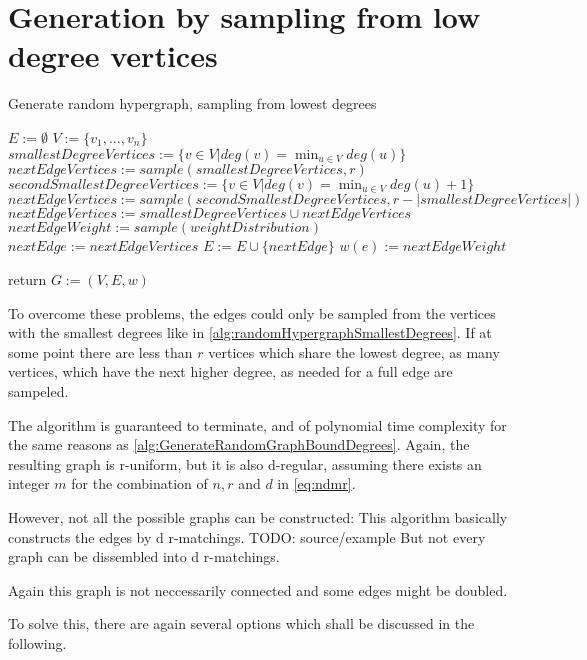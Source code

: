 \section{Generation by sampling from low degree vertices}
\begin{algorithm}
	\caption{Generate random hypergraph, sampling from lowest degrees\label{alg:randomHypergraphSmallestDegrees}} 
	\begin{algorithmic}
		\State $E := \emptyset$
		\State $V := \{v_1, \ldots, v_n\}$
		\State $ smallestDegreeVertices := \{v\in V| deg(v) = \min_{u\in V} deg(u) \}$
		\State $nextEdgeVertices := sample(smallestDegreeVertices, r) $ 
		\Else 
		\State $secondSmallestDegreeVertices := \{v\in V| deg(v) = \min_{u\in V} deg(u) +1 \}$
		\State $nextEdgeVertices :=  sample(secondSmallestDegreeVertices, r - | smallestDegreeVertices|)$
		\State $nextEdgeVertices := smallestDegreeVertices \cup nextEdgeVertices  $
		\EndIf
		\State $nextEdgeWeight := sample(weightDistribution)$ 
		\State $nextEdge := nextEdgeVertices$
		\State $E := E \cup \{nextEdge\}$
		\State $w(e):= nextEdgeWeight$
		
		\EndWhile
		\State return $G:=(V,E, w)$	
		\EndFunction 
	\end{algorithmic}
\end{algorithm}	
To overcome these problems, the edges could only be sampled from the vertices with the smallest degrees like in \cref{alg:randomHypergraphSmallestDegrees}. If at some point there are less than $r$ vertices which share the lowest degree, as many vertices, which have the next higher degree, as needed for a full edge are sampeled.

The algorithm is guaranteed to terminate, and of polynomial time complexity for the same reasons as \cref{alg:GenerateRandomGraphBoundDegrees}.
Again, the resulting graph is r-uniform, but it is also d-regular, assuming there exists an integer $m$ for the combination of $n, r$ and $d$ in \cref{eq:ndmr}.

However, not all the possible graphs can be constructed: This algorithm basically constructs the edges by d r-matchings. TODO: source/example But not every graph can be dissembled into d r-matchings.

Again this graph is not neccessarily connected and some edges might be doubled.

To solve this, there are again several options which shall be discussed in the following.
